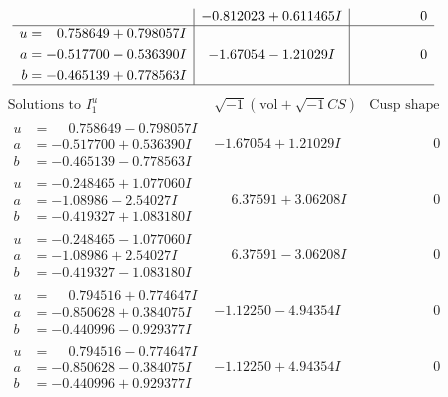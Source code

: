\documentclass[1p]{elsarticle_modified}
\theoremstyle{definition}
\newcommand{\I}{\sqrt{-1}}
\begin{document}
$$\begin{array}{c|c|c}
 & -0.812023 + 0.611465 I & \phantom{-0.000000 } 0 \\ \hline\begin{aligned}
u &= \phantom{-}0.758649 + 0.798057 I \\
a &= -0.517700 - 0.536390 I \\
b &= -0.465139 + 0.778563 I\end{aligned}
 & -1.67054 - 1.21029 I & \phantom{-0.000000 } 0\\
 \hline 
 \end{array}$$\newpage$$\begin{array}{c|c|c}  
\text{Solutions to }I^u_{1}& \I (\text{vol} + \sqrt{-1}CS) & \text{Cusp shape}\\
 \hline 
\begin{aligned}
u &= \phantom{-}0.758649 - 0.798057 I \\
a &= -0.517700 + 0.536390 I \\
b &= -0.465139 - 0.778563 I\end{aligned}
 & -1.67054 + 1.21029 I & \phantom{-0.000000 } 0 \\ \hline\begin{aligned}
u &= -0.248465 + 1.077060 I \\
a &= -1.08986 - 2.54027 I \\
b &= -0.419327 + 1.083180 I\end{aligned}
 & \phantom{-}6.37591 + 3.06208 I & \phantom{-0.000000 } 0 \\ \hline\begin{aligned}
u &= -0.248465 - 1.077060 I \\
a &= -1.08986 + 2.54027 I \\
b &= -0.419327 - 1.083180 I\end{aligned}
 & \phantom{-}6.37591 - 3.06208 I & \phantom{-0.000000 } 0 \\ \hline\begin{aligned}
u &= \phantom{-}0.794516 + 0.774647 I \\
a &= -0.850628 + 0.384075 I \\
b &= -0.440996 - 0.929377 I\end{aligned}
 & -1.12250 - 4.94354 I & \phantom{-0.000000 } 0 \\ \hline\begin{aligned}
u &= \phantom{-}0.794516 - 0.774647 I \\
a &= -0.850628 - 0.384075 I \\
b &= -0.440996 + 0.929377 I\end{aligned}
 & -1.12250 + 4.94354 I & \phantom{-0.000000 } 0 \\ \hline\begin{aligned}

\end{aligned}
\end{array}$$
\end{document}
